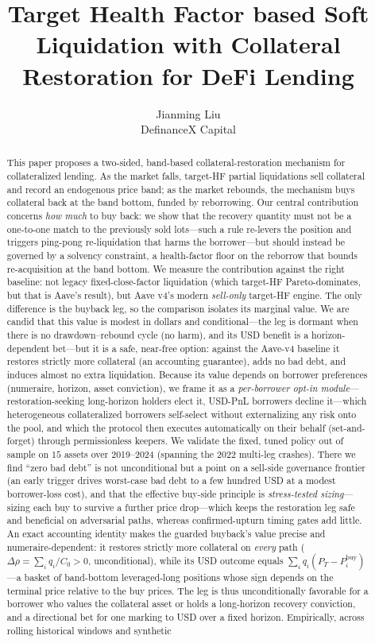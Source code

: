 \documentclass[12pt]{article}
\title{Target Health Factor based Soft Liquidation with Collateral Restoration for DeFi Lending}
\author{Jianming Liu\\
DefinanceX Capital}
\date{}
\begin{document}
\maketitle

\begin{abstract}
This paper proposes a two-sided, band-based collateral-restoration mechanism for collateralized lending. As the market falls, target-HF partial liquidations sell collateral and record an endogenous price band; as the market rebounds, the mechanism buys collateral back at the band bottom, funded by reborrowing. Our central contribution concerns \emph{how much} to buy back: we show that the recovery quantity must not be a one-to-one match to the previously sold lots---such a rule re-levers the position and triggers ping-pong re-liquidation that harms the borrower---but should instead be governed by a solvency constraint, a health-factor floor on the reborrow that bounds re-acquisition at the band bottom. We measure the contribution against the right baseline: not legacy fixed-close-factor liquidation (which target-HF Pareto-dominates, but that is Aave's result), but Aave v4's modern \emph{sell-only} target-HF engine. The only difference is the buyback leg, so the comparison isolates its marginal value. We are candid that this value is modest in dollars and conditional---the leg is dormant when there is no drawdown--rebound cycle (no harm), and its USD benefit is a horizon-dependent bet---but it is a safe, near-free option: against the Aave-v4 baseline it restores strictly more collateral (an accounting guarantee), adds no bad debt, and induces almost no extra liquidation. Because its value depends on borrower preferences (numeraire, horizon, asset conviction), we frame it as a \emph{per-borrower opt-in module}---restoration-seeking long-horizon holders elect it, USD-PnL borrowers decline it---which heterogeneous collateralized borrowers self-select without externalizing any risk onto the pool, and which the protocol then executes automatically on their behalf (set-and-forget) through permissionless keepers. We validate the fixed, tuned policy out of sample on $15$ assets over 2019--2024 (spanning the 2022 multi-leg crashes). There we find ``zero bad debt'' is not unconditional but a point on a sell-side governance frontier (an early trigger drives worst-case bad debt to a few hundred USD at a modest borrower-loss cost), and that the effective buy-side principle is \emph{stress-tested sizing}---sizing each buy to survive a further price drop---which keeps the restoration leg safe and beneficial on adversarial paths, whereas confirmed-upturn timing gates add little. An exact accounting identity makes the guarded buyback's value precise and numeraire-dependent: it restores strictly more collateral on \emph{every} path ($\Delta\rho=\sum_i q_i/C_0>0$, unconditional), while its USD outcome equals $\sum_i q_i(P_T-P_i^{\text{buy}})$---a basket of band-bottom leveraged-long positions whose sign depends on the terminal price relative to the buy prices. The leg is thus unconditionally favorable for a borrower who values the collateral asset or holds a long-horizon recovery conviction, and a directional bet for one marking to USD over a fixed horizon. Empirically, across rolling historical windows and synthetic 
\end{abstract}
\end{document}
